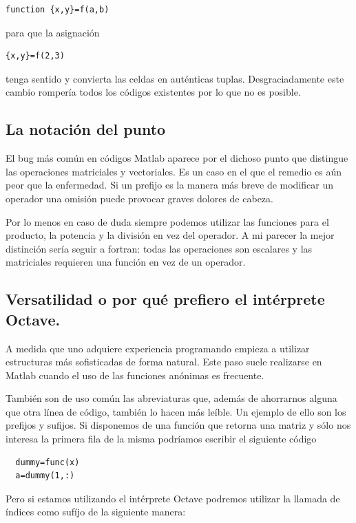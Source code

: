 \begin{lstlisting}
function {x,y}=f(a,b)
\end{lstlisting}

para que la asignación

\begin{lstlisting}
{x,y}=f(2,3)
\end{lstlisting}

tenga sentido y convierta las celdas en auténticas
tuplas. Desgraciadamente este cambio rompería todos los códigos
existentes por lo que no es posible.

\subsection{La notación del punto}

El bug más común en códigos Matlab aparece por el dichoso punto que
distingue las operaciones matriciales y vectoriales. Es un caso en el
que el remedio es aún peor que la enfermedad.  Si un prefijo es la
manera más breve de modificar un operador una omisión puede provocar
graves dolores de cabeza.

Por lo menos en caso de duda siempre podemos utilizar las funciones
para el producto, la potencia y la división en vez del operador.  A mi
parecer la mejor distinción sería seguir a fortran: todas las
operaciones son escalares y las matriciales requieren una función en
vez de un operador.

\subsection{Versatilidad o por qué prefiero el intérprete Octave.}

A medida que uno adquiere experiencia programando empieza a utilizar
estructuras más sofisticadas de forma natural.  Este paso suele
realizarse en Matlab cuando el uso de las funciones anónimas es
frecuente. 

También son de uso común las abreviaturas que, además de ahorrarnos
alguna que otra línea de código, también lo hacen más leíble. Un
ejemplo de ello son los prefijos y sufijos.  Si disponemos de una
función que retorna una matriz y sólo nos interesa la primera fila de
la misma podríamos escribir el siguiente código

\begin{lstlisting}
  dummy=func(x)
  a=dummy(1,:)
\end{lstlisting}

Pero si estamos utilizando el intérprete Octave podremos utilizar la
llamada de índices como sufíjo de la siguiente manera:

